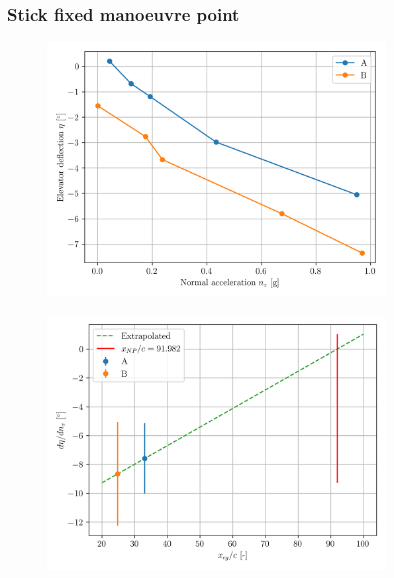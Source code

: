 \documentclass{article}
\begin{document}
\subsubsection{Stick fixed manoeuvre point}
\begin{figure}[H]
    \centering
    \includegraphics[width=0.8\textwidth]{Manoeuvre_Stability_1.png}
    \caption{}
    \label{fig:Manoeuvre_Stability_1}
\end{figure}
\begin{figure}[H]
    \centering
    \includegraphics[width=0.8\textwidth]{Manoeuvre_Stability_2.png}
    \caption{}
    \label{fig:Manoeuvre_Stability_2}
\end{figure}
\end{document}
